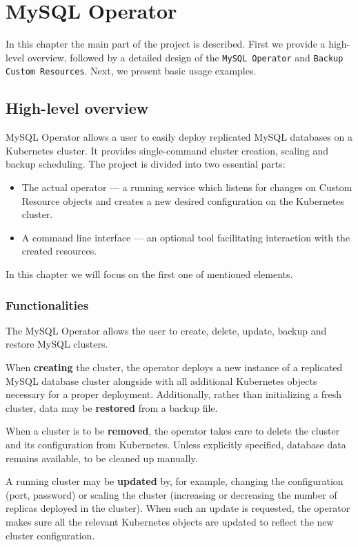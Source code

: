 \chapter{MySQL Operator}

In this chapter the main part of the project is described. First we provide 
a high-level overview, followed by a detailed design of the \texttt{MySQL Operator} 
and \texttt{Backup Custom Resources}. Next, we present basic usage examples.

\section{High-level overview}
MySQL Operator allows a user to easily deploy replicated MySQL databases on a Kubernetes cluster.
It provides single-command cluster creation, scaling and backup scheduling. The project is divided
into two essential parts:
\begin{itemize}
	\item The actual operator --- a running service which listens for changes on Custom Resource
	objects and creates a new desired configuration on the Kubernetes cluster.
	\item A command line interface --- an optional tool facilitating interaction with the created
	resources.
\end{itemize}

In this chapter we will focus on the first one of mentioned elements.

\subsection{Functionalities}
The MySQL Operator allows the user to create, delete, update, backup and restore MySQL clusters.

When \textbf{creating} the cluster, the operator deploys a new instance of a replicated MySQL
database cluster alongside with all additional Kubernetes objects necessary for a proper deployment.
Additionally, rather than initializing a fresh cluster, data may be
\textbf{restored} from a backup file.

When a cluster is to be \textbf{removed}, the operator takes care to delete the cluster and its
configuration from Kubernetes. Unless explicitly specified, database data remains available, to be
cleaned up manually.

A running cluster may be \textbf{updated} by, for example, changing the configuration (port,
password) or scaling the cluster (increasing or decreasing the number of replicas deployed in the
cluster). When such an update is requested, the operator makes sure all the relevant Kubernetes
objects are updated to reflect the new cluster configuration.

